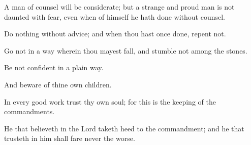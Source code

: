 {\par }{\PP {}A man of counsel will be considerate; but a strange and proud man is not daunted with fear, even when of himself he hath done without counsel.
\par }{\PP {}Do nothing without advice; and when thou hast once done, repent not.
\par }{\PP {}Go not in a way wherein thou mayest fall, and stumble not among the stones.
\par }{\PP {}Be not confident in a plain way.
\par }{\PP {}And beware of thine own children.
\par }{\PP {}In every good work trust thy own soul; for this is the keeping of the commandments.
\par }{\PP {}He that believeth in the Lord taketh heed to the commandment; and he that trusteth in him shall fare never the worse.

}
